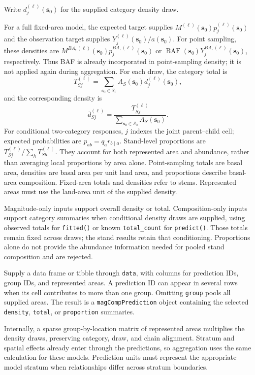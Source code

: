 \documentclass[11pt]{article}
\newcommand{\bs}{\bm{s}}
\begin{document}
Write \(d_j^{(\ell)}(\bs_0)\) for the supplied category density draw.

For a full fixed-area model, the expected target supplies
\(M^{(\ell)}(\bs_0)p_j^{(\ell)}(\bs_0)\) and the observation target supplies
\(Y_j^{(\ell)}(\bs_0)/a(\bs_0)\). For point sampling, these densities are
\(M^{BA,(\ell)}(\bs_0)p_j^{BA,(\ell)}(\bs_0)\) or
\(\operatorname{BAF}(\bs_0)Y_j^{BA,(\ell)}(\bs_0)\), respectively.
Thus BAF is already incorporated in point-sampling density; it is not applied
again during aggregation. For each draw, the category total is
\begin{equation}
 T_{Sj}^{(\ell)}=\sum_{\bs_0\in\mathcal S_0}
       A_S(\bs_0)d_j^{(\ell)}(\bs_0),
 \label{eq:stand-total}
\end{equation}
and the corresponding density is
\begin{equation}
 \bar d_{Sj}^{(\ell)}=
 \frac{T_{Sj}^{(\ell)}}{\sum_{\bs_0\in\mathcal S_0}A_S(\bs_0)}.
 \label{eq:stand-mean}
\end{equation}
For conditional two-category responses, \(j\) indexes the joint parent--child
cell; expected probabilities are \(p_{ab}=q_a r_{b\mid a}\).
Stand-level proportions are \(T_{Sj}^{(\ell)}/\sum_hT_{Sh}^{(\ell)}\).
They account for both represented area and abundance, rather than averaging
local proportions by area alone. Point-sampling totals are basal area,
densities are basal area per unit land area, and proportions describe basal-area
composition. Fixed-area totals and densities refer to stems. Represented
areas must use the land-area unit of the supplied density.

Magnitude-only inputs support overall density or total. Composition-only inputs
support category summaries when conditional density draws are supplied, using
observed totals for \texttt{fitted()} or known \texttt{total\_count} for
\texttt{predict()}. Those totals remain fixed across draws; the stand results
retain that conditioning. Proportions alone do not provide the abundance
information needed for pooled stand composition and are rejected.

Supply a data frame or tibble through \texttt{data}, with columns for prediction
IDs, group IDs, and represented areas. A prediction ID can appear in several
rows when its cell contributes to more than one group. Omitting \texttt{group}
pools all supplied areas. The result is a \texttt{magCompPrediction} object
containing the selected \texttt{density}, \texttt{total}, or
\texttt{proportion} summaries.

Internally, a sparse group-by-location matrix of represented areas multiplies
the density draws, preserving category, draw, and chain alignment.
Stratum and spatial effects already enter
through the predictions, so aggregation uses the same calculation for these
models. Prediction units must represent the appropriate model stratum when
relationships differ across stratum boundaries.
\end{document}
